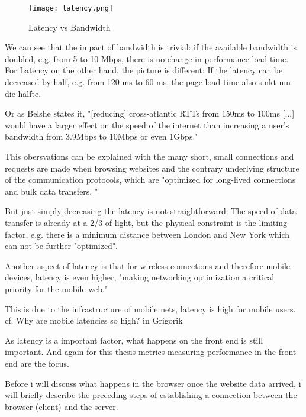 \begin{figure}[h!]
\begin{center}
\texttt{[image: latency.png]}
\caption{Latency vs Bandwidth}
\label{img:latency}
\end{center}
\end{figure}


We can see that the impact of bandwidth is trivial: if the available bandwidth is doubled, e.g. from 5 to 10 Mbps, there is no change in performance load time.
For Latency on the other hand, the picture is different: If the latency can be decreased by half, e.g. from 120 ms to 60 ms, the page load time also sinkt um die hälfte.

Or as Belshe states it, "[reducing] cross-atlantic RTTs from 150ms to 100ms [...] would have a larger effect on the speed of the internet than increasing a user's bandwidth from 3.9Mbps to 10Mbps or even 1Gbps." %

This obersvations can be explained with the many short, small connections and requests are made when browsing websites and the contrary underlying structure of the communication protocols, which are "optimized for long-lived connections and bulk data transfers. " %

But just simply decreasing the latency is not straightforward: The speed of data transfer is already at a 2/3 of light, but the physical constraint is the limiting factor, e.g. there is a minimum distance between London and New York which can not be further "optimized". %



Another aspect of latency is that for wireless connections and therefore mobile devices, latency is even higher, "making networking optimization a critical priority for the mobile web." %

This is due to the infrastructure of mobile nets, latency is high for mobile users. cf.  Why are mobile latencies so high? in Grigorik %



As latency is a important factor, what happens on the front end is still important.
And again for this thesis metrics measuring performance in the front end are the focus.

Before i will discuss what happens in the browser once the website data arrived, i will briefly describe the preceding steps of establishing a connection between the browser (client) and the server.



